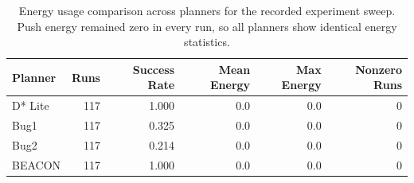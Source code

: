 \begin{table}[t]
\centering
\caption{Energy usage comparison across planners for the recorded experiment sweep. Push energy remained zero in every run, so all planners show identical energy statistics.}
\label{tab:energy-comparison-overall}
\begin{tabular}{lrrrrr}
\hline
\textbf{Planner} & \textbf{Runs} & \textbf{Success Rate} & \textbf{Mean Energy} & \textbf{Max Energy} & \textbf{Nonzero Runs} \\
\hline
D* Lite & 117 & 1.000 & 0.0 & 0.0 & 0 \\
Bug1 & 117 & 0.325 & 0.0 & 0.0 & 0 \\
Bug2 & 117 & 0.214 & 0.0 & 0.0 & 0 \\
BEACON & 117 & 1.000 & 0.0 & 0.0 & 0 \\
\hline
\end{tabular}
\end{table}
